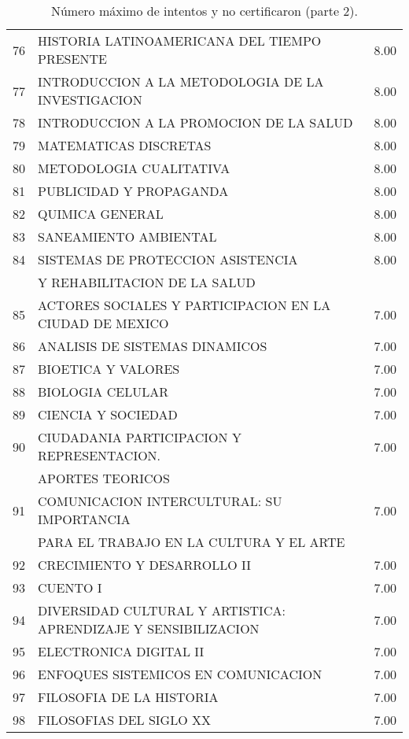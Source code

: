 \documentclass[12pt]{article}
\begin{document}
\begin{table}[ht]
{\begin{tabular}{rlr}
  76 & HISTORIA LATINOAMERICANA DEL TIEMPO PRESENTE & 8.00 \\ 
  77 & INTRODUCCION A LA METODOLOGIA DE LA INVESTIGACION & 8.00 \\ 
  78 & INTRODUCCION A LA PROMOCION DE LA SALUD & 8.00 \\ 
  79 & MATEMATICAS DISCRETAS & 8.00 \\ 
  80 & METODOLOGIA CUALITATIVA & 8.00 \\ 
  81 & PUBLICIDAD Y PROPAGANDA & 8.00 \\ 
  82 & QUIMICA GENERAL & 8.00 \\ 
  83 & SANEAMIENTO AMBIENTAL & 8.00 \\ 
  84 & SISTEMAS DE PROTECCION ASISTENCIA  & 8.00 \\ 
  & Y REHABILITACION DE LA SALUD &  \\ 
  85 & ACTORES SOCIALES Y PARTICIPACION EN LA CIUDAD DE MEXICO & 7.00 \\ 
  86 & ANALISIS DE SISTEMAS DINAMICOS & 7.00 \\ 
  87 & BIOETICA Y VALORES & 7.00 \\ 
  88 & BIOLOGIA CELULAR & 7.00 \\ 
  89 & CIENCIA Y SOCIEDAD & 7.00 \\ 
  90 & CIUDADANIA PARTICIPACION Y REPRESENTACION. & 7.00 \\ 
   & APORTES TEORICOS &  \\ 
  91 & COMUNICACION INTERCULTURAL: SU IMPORTANCIA& 7.00 \\ 
   & PARA EL TRABAJO EN LA CULTURA Y EL ARTE & \\ 
  92 & CRECIMIENTO Y DESARROLLO II & 7.00 \\ 
 93 & CUENTO I & 7.00 \\ 
  94 & DIVERSIDAD CULTURAL Y ARTISTICA: APRENDIZAJE Y SENSIBILIZACION & 7.00 \\ 
  95 & ELECTRONICA DIGITAL II & 7.00 \\ 
  96 & ENFOQUES SISTEMICOS EN COMUNICACION & 7.00 \\ 
  97 & FILOSOFIA DE LA HISTORIA & 7.00 \\ 
  98 & FILOSOFIAS DEL SIGLO XX & 7.00 \\ 
   \hline
\end{tabular}
}\caption{\label{Num_Max_Intentos_Nunca_Cert_2} N\'umero m\'aximo de intentos y no certificaron (parte 2).}

\end{table}
\end{document}
